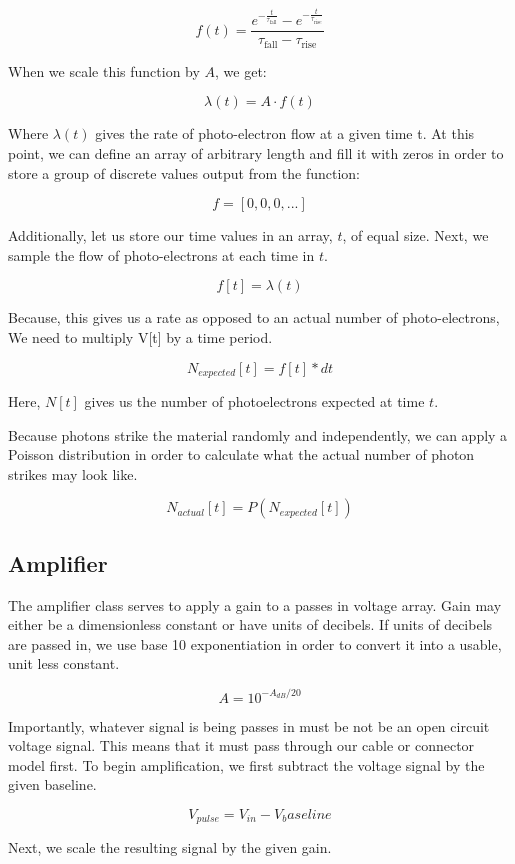 \documentclass[10pt]{article}
\begin{document}
$$
f(t) = \frac{e^{-\frac{t}{\tau_{\text{fall}}}} - e^{-\frac{t}{\tau_{\text{rise}}}}}{\tau_{\text{fall}} - \tau_{\text{rise}}}
$$

When we scale this function by $A$, we get:

$$
\lambda(t) = A\cdot f(t)
$$ 

Where $\lambda(t)$ gives the rate of photo-electron flow at a given time t. At this point, we can define an array of arbitrary length and fill it with zeros in order to store a group of discrete values output from the function:

$$
f = [0,0,0,...]
$$

Additionally, let us store our time values in an array, $t$, of equal size. Next, we sample the flow of photo-electrons at each time in $t$.

$$
f[t] = \lambda(t)
$$

Because, this gives us a rate as opposed to an actual number of photo-electrons, We need to multiply V[t] by a time period.

$$
N_{expected}[t] = f[t] * dt
$$

Here, $N[t]$ gives us the number of photoelectrons expected at time $t$.

Because photons strike the material randomly and independently, we can apply a Poisson distribution in order to calculate what the actual number of photon strikes may look like.   

$$
N_{actual}[t] = P( N_{expected}[t] )
$$





\subsection{Amplifier}
The amplifier class serves to apply a gain to a passes in voltage array. Gain may either be a dimensionless constant or have units of decibels. If units of decibels are passed in, we use base 10 exponentiation in order to convert it into a usable, unit less constant. 

$$
A = 10^{-A_{dB}/20}
$$

Importantly, whatever signal is being passes in must be not be an open circuit voltage signal. This means that it must pass through our cable or connector model first. To begin amplification, we first subtract the voltage signal by the given baseline. 


$$
V_{pulse} = V_{in} - V_baseline 
$$

Next, we scale the resulting signal by the given gain.
\end{document}
